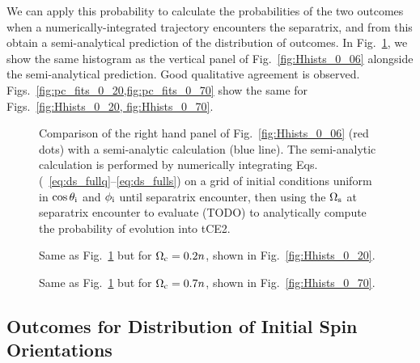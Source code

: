 \documentclass[
        fleqn,
        usenatbib,
    ]{mnras}
\begin{document}
We can apply this probability to calculate the probabilities of the two outcomes
when a numerically-integrated trajectory encounters the separatrix, and from
this obtain a semi-analytical prediction of the distribution of outcomes. In
Fig.~\ref{fig:pc_fits_0_06}, we show the same histogram as the vertical panel of
Fig.~\ref{fig:Hhists_0_06} alongside the semi-analytical prediction. Good
qualitative agreement is observed. Figs.~\ref{fig:pc_fits_0_20,fig:pc_fits_0_70}
show the same for Figs.~\ref{fig:Hhists_0_20, fig:Hhists_0_70}.
\begin{figure}
    \centering
    \caption{Comparison of the right hand panel of Fig.~\ref{fig:Hhists_0_06}
    (red dots) with a semi-analytic calculation (blue line). The semi-analytic
    calculation is performed by numerically integrating
    Eqs.(~\ref{eq:ds_fullq}--\ref{eq:ds_fulls}) on a grid of initial
    conditions uniform in $\cos \theta_{\rm i}$ and $\phi_{\rm i}$ until
    separatrix encounter, then using the $\Omega_{\rm s}$ at separatrix
    encounter to evaluate (TODO) to analytically compute the probability of
    evolution into tCE2.}\label{fig:pc_fits_0_06}
\end{figure}
\begin{figure}
    \centering
    \caption{Same as Fig.~\ref{fig:pc_fits_0_06} but for $\Omega_{\rm c} =
    0.2n$, shown in Fig.~\ref{fig:Hhists_0_20}.}\label{fig:pc_fits_0_20}
\end{figure}
\begin{figure}
    \centering
    \caption{Same as Fig.~\ref{fig:pc_fits_0_06} but for $\Omega_{\rm c} =
    0.7n$, shown in Fig.~\ref{fig:Hhists_0_70}.}\label{fig:pc_fits_0_70}
\end{figure}

\subsection{Outcomes for Distribution of Initial Spin Orientations
}\label{ss:s_c_dist}
\end{document}
